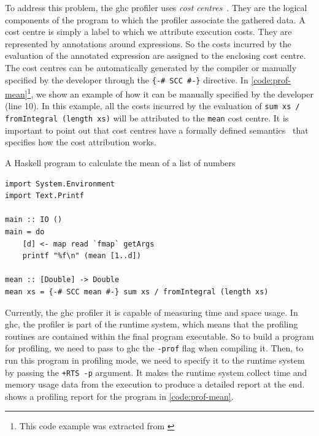 To address this problem, the \ac{ghc} profiler uses \emph{cost centres}~\citep{sansom:1995}. They are the logical components of the program to which the profiler associate the gathered data. A cost centre is simply a label to which we attribute execution costs. They are represented by annotations around expressions. So the costs incurred by the evaluation of the annotated expression are assigned to the enclosing cost centre. The cost centres can be automatically generated by the compiler or manually specified by the developer through the \texttt{\{-\# SCC \#-\}} directive. In \autoref{code:prof-mean}\footnote{This code example was extracted from \cite{sullivan:2008}}, we show an example of how it can be manually specified by the developer (line 10). In this example, all the costs incurred by the evaluation of \texttt{sum xs / fromIntegral (length xs)} will be attributed to the \texttt{mean} cost centre. It is important to point out that cost centres have a formally defined semantics~\citep{sansom:1995} that specifies how the cost attribution works.

\begin{listing}
  \caption{A Haskell program to calculate the mean of a list of numbers}
  \begin{verbatim}
import System.Environment
import Text.Printf

main :: IO ()
main = do
    [d] <- map read `fmap` getArgs
    printf "%f\n" (mean [1..d])

mean :: [Double] -> Double
mean xs = {-# SCC mean #-} sum xs / fromIntegral (length xs)
  \end{verbatim}
  \label{code:prof-mean}
\end{listing}

Currently, the \ac{ghc} profiler it is capable of measuring time and space usage. In \ac{ghc}, the profiler is part of the runtime system, which means that the profiling routines are contained within the final program executable. So to build a program for profiling, we need to pass to \ac{ghc} the \texttt{-prof} flag when compiling it. Then, to run this program in profiling mode, we need to specify it to the runtime system by passing the \texttt{+RTS -p} argument. It makes the runtime system collect time and memory usage data from the execution to produce a detailed report at the end.  shows a profiling report for the program in \autoref{code:prof-mean}.

